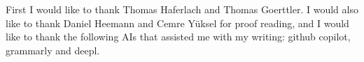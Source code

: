 
\begin{acknowledgments}

First I would like to thank Thomas Haferlach and Thomas Goerttler.
I would also like to thank Daniel Heemann and Cemre Yüksel for proof reading, and I would like to thank the following AIs that assisted me with my writing: github copilot, grammarly and deepl.
\end{acknowledgments}
